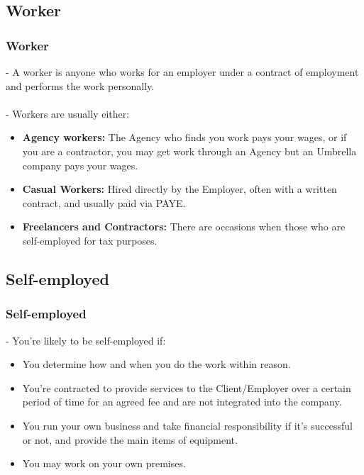 \subsection[Worker]{Worker}
\begin{frame}
	\frametitle{Worker}
	- A worker is anyone who works for an employer under a contract of employment and performs the work personally.
	\\~\\
	- Workers are usually either:
	\vspace{1mm}
	\fontsize{9}{12}\selectfont
	 \begin{itemize} \itemsep0.3em
	    \item \textbf{Agency workers:} The Agency who finds you work pays your wages, or if you are a contractor, you may get work through an Agency but an Umbrella company pays your wages.
	    \item  \textbf{Casual Workers:} Hired directly by the Employer, often with a written contract, and usually paid via PAYE.
	    \item  \textbf{Freelancers and Contractors:} There are occasions when those who are self-employed for tax purposes.
	 \end{itemize}
\end{frame}

\subsection[Self-employed]{Self-employed}
\begin{frame}
	\frametitle{Self-employed}
	- You’re likely to be self-employed if:
	\vspace{1mm}
	\fontsize{9}{12}\selectfont
	 \begin{itemize} \itemsep0.3em
	    \item  You determine how and when you do the work within reason.
	    \item  You’re contracted to provide services to the Client/Employer over a certain period of time for an agreed fee and are not integrated into the company.
	    \item  You run your own business and take financial responsibility if it’s successful or not, and provide the main items of equipment.
	    \item  You may work on your own premises.
	 \end{itemize}
\end{frame}
